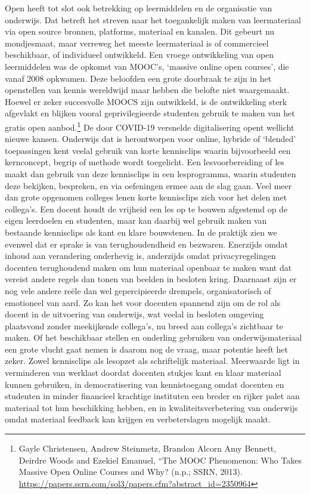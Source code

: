 \documentclass{jote-book}
\begin{document}
	Open heeft tot slot ook betrekking op leermiddelen en de organisatie van onderwijs. Dat betreft het streven naar het toegankelijk maken van leermateriaal via open source bronnen, platforms, materiaal en kanalen. Dit gebeurt nu mondjesmaat, maar verreweg het meeste leermateriaal is of commercieel beschikbaar, of individueel ontwikkeld. Een vroege ontwikkeling van open leermiddelen was de opkomst van MOOC's, ‘massive online open courses', die vanaf 2008 opkwamen. Deze beloofden een grote doorbraak te zijn in het openstellen van kennis wereldwijd maar hebben die belofte niet waargemaakt. Hoewel er zeker succesvolle MOOCS zijn ontwikkeld, is de ontwikkeling sterk afgevlakt en blijken vooral geprivilegieerde studenten gebruik te maken van het gratis open aanbod.\footnote{Gayle Christensen, Andrew Steinmetz, Brandon Alcorn Amy Bennett, Deirdre Woods and Ezekiel Emanuel, “The MOOC Phenomenon: Who Takes Massive Open Online Courses and Why? (n.p.; SSRN, 2013). \href{https://papers.ssrn.com/sol3/papers.cfm?abstract_id=2350964}{https://papers.ssrn.com/sol3/papers.cfm?abstract\_id=2350964} } De door COVID-19 versnelde digitalisering opent wellicht nieuwe kansen. Onderwijs dat is herontworpen voor online, hybride of ‘blended' toepassingen kent veelal gebruik van korte kennisclips waarin bijvoorbeeld een kernconcept, begrip of methode wordt toegelicht. Een lesvoorbereiding of les maakt dan gebruik van deze kennisclips in een lesprogramma, waarin studenten deze bekijken, bespreken, en via oefeningen ermee aan de slag gaan. Veel meer dan grote opgenomen colleges lenen korte kennisclips zich voor het delen met collega's. Een docent houdt de vrijheid een les op te bouwen afgestemd op de eigen leerdoelen en studenten, maar kan daarbij wel gebruik maken van bestaande kennisclips als kant en klare bouwstenen. In de praktijk zien we evenwel dat er sprake is van terughoudendheid en bezwaren. Enerzijds omdat inhoud aan verandering onderhevig is, anderzijds omdat privacyregelingen docenten terughoudend maken om hun materiaal openbaar te maken want dat vereist andere regels dan tonen van beelden in besloten kring. Daarnaast zijn er nog vele andere reële dan wel gepercipieerde drempels, organisatorisch of emotioneel van aard. Zo kan het voor docenten spannend zijn om de rol als docent in de uitvoering van onderwijs, wat veelal in besloten omgeving plaatsvond zonder meekijkende collega's, nu breed aan collega's zichtbaar te maken. Of het beschikbaar stellen en onderling gebruiken van onderwijsmateriaal een grote vlucht gaat nemen is daarom nog de vraag, maar potentie heeft het zeker. Zowel kennisclips als lesopzet als schriftelijk materiaal. Meerwaarde ligt in verminderen van werklast doordat docenten stukjes kant en klaar materiaal kunnen gebruiken, in democratisering van kennistoegang omdat docenten en studenten in minder financieel krachtige instituten een breder en rijker palet aan materiaal tot hun beschikking hebben, en in kwaliteitsverbetering van onderwijs omdat materiaal feedback kan krijgen en verbeterslagen mogelijk maakt.
\end{document}
